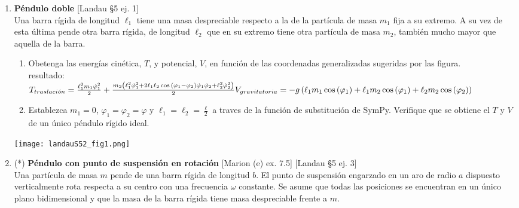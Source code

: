 \documentclass[11pt, spanish, a4paper, twoside]{article}
\begin{document}
\begin{enumerate}
\item
	\begin{minipage}[t][6cm]{0.7\textwidth}
		\textbf{Péndulo doble} [Landau \S5 ej. 1]\\
		Una barra rígida de longitud \(\ell_1\) tiene una masa despreciable respecto a la de la partícula de masa \(m_1\) fija a su extremo.
		A su vez de esta última pende otra barra rígida, de longitud \(\ell_2\) que en su extremo tiene otra partícula de masa \(m_2\), también mucho mayor que aquella de la barra.
		\begin{enumerate}
			\item Obetenga las energías cinética, \(T\), y potencial, \(V\), en función de las coordenadas generalizadas sugeridas por las figura.\\
			resultado:\\
			\(
				T_{traslaci\acute{o}n} = \frac{\ell_{1}^{2} m_{1} \dot{\varphi}_{1}^{2}}{2} + \frac{m_{2} \left(\ell_{1}^{2} \dot{\varphi}_{1}^{2} + 2 \ell_{1} \ell_{2} \cos{\left(\varphi_{1} - \varphi_{2} \right)} \dot{\varphi}_{1} \dot{\varphi}_{2} + \ell_{2}^{2} \dot{\varphi}_{2}^{2}\right)}{2}\\
				V_{gravitatoria} = - g \left(\ell_{1} m_{1} \cos{\left(\varphi_{1} \right)} + \ell_{1} m_{2} \cos{\left(\varphi_{1} \right)} + \ell_{2} m_{2} \cos{\left(\varphi_{2} \right)}\right)
			\)
			\item Establezca \(m_1 = 0\), \(\varphi_1 = \varphi_2 = \varphi\) y \(\ell_1 = \ell_2 = \frac{\ell}{2}\) a traves de la función de substitución de SymPy. Verifique que se obtiene el \(T\) y \(V\) de un único péndulo rígido ideal.
		\end{enumerate}
	\end{minipage}
	\begin{minipage}[c][0.5cm][t]{0.3\textwidth}
		\texttt{[image: landauS52\_fig1.png]}
	\end{minipage}



\item
	\begin{minipage}[t][7.1cm]{0.55\textwidth}
		(*) \textbf{Péndulo con punto de suspensión en rotación} [Marion (e) ex. 7.5] [Landau \S5 ej. 3]\\

		Una partícula de masa \(m\) pende de una barra rígida de longitud \(b\).
		El punto de suspensión engarzado en un aro de radio \(a\) dispuesto verticalmente rota respecta a su centro con una frecuencia \(\omega\) constante.
		Se asume que todas las posiciones se encuentran en un único plano bidimensional y que la masa de la barra rígida tiene masa despreciable frente a \(m\).


\end{minipage}
\end{enumerate}
\end{document}
